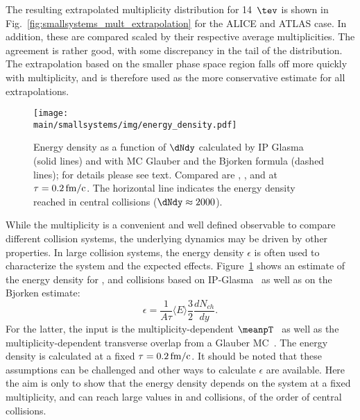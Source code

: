 \documentclass[../report.tex]{subfiles}
\providecommand{\main}{..}
\begin{document}
The resulting extrapolated multiplicity distribution for 14~$\tev$ is shown in Fig.~\ref{fig:smallsystems_mult_extrapolation} for the ALICE and ATLAS case. In addition, these are compared scaled by their respective average multiplicities. The agreement is rather good, with some discrepancy in the tail of the distribution. The extrapolation based on the smaller phase space region falls off more quickly with multiplicity, and is therefore used as the more conservative estimate for all extrapolations.

\begin{figure}[ht]
\centering
\texttt{[image: \\main/smallsystems/img/energy\_density.pdf]}
\caption{Energy density as a function of $\dNdy$ calculated by IP Glasma (solid lines) and with MC Glauber and the Bjorken formula (dashed lines); for details please see text. Compared are \pp, \pPb, and \PbPb at $\tau = \unit[0.2]{fm/c}$. The horizontal line indicates the energy density reached in central \PbPb collisions ($\dNdy \approx 2000$).}
\label{fig:energy_density}
\end{figure}

While the multiplicity is a convenient and well defined observable to compare different collision systems, the underlying dynamics may be driven by other properties. In large collision systems, the energy density $\epsilon$ is often used to characterize the system and the expected effects. Figure~\ref{fig:energy_density} shows an estimate of the energy density for \pp, \pPb and \PbPb collisions based on IP-Glasma~\cite{Bzdak:2013zma,SchenkePriv1} as well as on the Bjorken estimate:
\begin{equation}
  \epsilon = \frac{1}{A \tau} \langle E \rangle \frac{3}{2} \frac{dN_{ch}}{dy}.
\end{equation}
For the latter, the input is the multiplicity-dependent $\meanpT$~\cite{Abelev:2013bla,Acharya:2018njl} as well as the multiplicity-dependent transverse overlap from a Glauber MC~\cite{Loizides:2017ack}. The energy density is calculated at a fixed $\tau = \unit[0.2]{fm/c}$. It should be noted that these assumptions can be challenged and other ways to calculate $\epsilon$ are available. Here the aim is only to show that the energy density depends on the system at a fixed multiplicity, and can reach large values in \pp and \pPb collisions, of the order of central \PbPb collisions.
\end{document}
